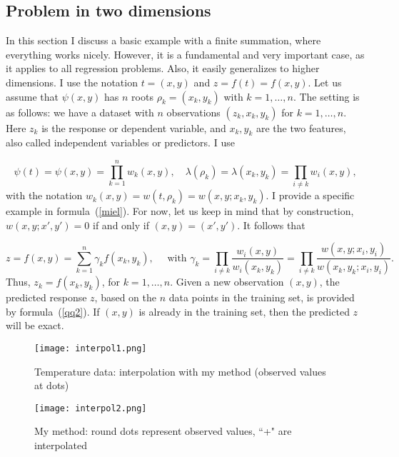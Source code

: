 \documentclass[oneside,10pt]{book}
\begin{document}
\subsection{Problem in two dimensions} \label{totor}

In this section I discuss a basic example with a finite summation, where everything works nicely. However, it is a fundamental and very important case, as it applies to all regression problems. Also, it easily generalizes to higher dimensions. I use the notation
 $t=(x,y)$ and $z=f(t)=f(x, y)$. Let us assume that $\psi(x,y)$ has $n$ roots $\rho_k=(x_k,y_k)$ with $k=1,\dots,n$. The setting is as follows: we have a dataset with $n$ observations $(z_k,x_k,y_k)$ for $k=1,\dots,n$. Here $z_k$ is the response or
 dependent variable, and $x_k, y_k$ are the two features, also called independent variables or predictors. I use

$$
\psi(t) = \psi(x,y) = \prod_{k=1}^n w_k(x,y), \quad \lambda(\rho_k)=\lambda(x_k,y_k) = \prod_{i\neq k} w_i(x,y),
$$
with the notation $w_k(x,y) = w(t,\rho_k) = w(x, y; x_k, y_k)$. I provide a specific example in formula~(\ref{miel}). For now, let us keep in mind that by construction, $w(x, y; x', y')=0$ if and only if $(x,y)=(x',y')$. It follows that

\begin{equation}
z = f(x,y) =  \sum_{k=1}^n   \gamma_k f(x_k,y_k), \quad \text{ with } \gamma_k =
\prod_{i\neq k} \frac{w_i(x,y)}{w_i(x_k,y_k)}
=\prod_{i\neq k} \frac{w(x,y; x_i,y_i)}{w(x_k,y_k; x_i,y_i)}
. \label{qq2}
\end{equation}
Thus, $z_k = f(x_k,y_k)$, for $k=1,\dots,n$. Given a new observation $(x, y)$, the predicted response $z$, based on the $n$ data points in the training set, is provided
 by formula~(\ref{qq2}). If $(x,y)$ is already in the training set, then the predicted $z$ will be exact.


\begin{figure}%
\centering
\texttt{[image: interpol1.png]} %
\caption{Temperature data: interpolation with my method (observed values at dots)}
\label{fig:interpol1}
\end{figure}

\begin{figure}%
\centering
\texttt{[image: interpol2.png]} %
\caption{My method: round dots represent observed values, ``+" are interpolated}
\label{fig:interpol2}
\end{figure}
\end{document}
